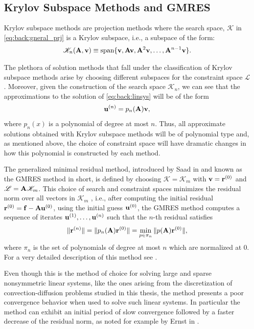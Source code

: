 \subsection{Krylov Subspace Methods and GMRES}
\label{back:itersolvers:krylov}

Krylov subspace methods are projection methods where the search space,
$\mathscr{K}$ in \eqref{eq:back:gneral_prj} is a Krylov subspace, i.e., a
subspace of the form:
\begin{equation}\label{eq:back:krylov}
\mathscr{K}_{n}(\mathbf{A},\mathbf{v})\equiv\text{span}\{\mathbf{v},\mathbf{A}\mathbf{v},\mathbf{A}^2\mathbf{v},\ldots,\mathbf{A}^{n-1}\mathbf{v}\}.
\end{equation}

The plethora of solution methods that fall under the classification of Krylov subspace methods  arise by choosing different subspaces for the constraint space $\mathscr{L}$. Moreover, given the construction of the search space $\mathscr{K}_{n}$, we can see that the approximations to the solution of \eqref{eq:back:linsys} will be of the form
\begin{equation}
\mathbf{u}^{(n)}=p_{n}(\mathbf{A})\mathbf{v},
\end{equation}
where $p_{n}(x)$ is a polynomial of degree at most $n$. Thus, all approximate
solutions obtained with Krylov subspace methods will be of polynomial type and,
as mentioned above, the choice of constraint space will have dramatic changes
in how this polynomial is constructed by each method.

The generalized minimal residual method, introduced by Saad in \cite{Saa86} and known as the GMRES method in short, is defined by choosing $\mathscr{K}=\mathscr{K}_m$ with $\mathbf{v}=\mathbf{r}^{(0)}$ and $\mathscr{L}=\mathbf{A}\mathscr{K}_m$. This choice of search and constraint spaces minimizes the residual norm over all vectors in $\mathscr{K}_m$ \cite{Saa03}, i.e., after computing the initial residual $\mathbf{r}^{(0)}=\mathbf{f}-\mathbf{A}\mathbf{u}^{(0)}$, using the initial guess $\mathbf{u}^{(0)}$, the GMRES method computes a sequence of iterates $\mathbf{u}^{(1)},\ldots,\mathbf{u}^{(n)}$
such that the $n$-th residual satisfies
\begin{equation}
\|\mathbf{r}^{(n)}\|=\|p_{n}(\mathbf{A})\mathbf{r}^{(0)}\|=\min_{p \in \pi_n}\|p(\mathbf{A})\mathbf{r}^{(0)}\|,
\end{equation}
where $\pi_n$ is the set of polynomials of degree at most $n$ which are
normalized at $0$. For a very detailed description of this method see \cite{LieStr12}.

Even though this is the method of choice for solving large and sparse nonsymmetric linear systems, like the ones arising from the discretization of convection-diffusion problems studied in this thesis, the method presents a poor convergence behavior when used to solve such linear systems. In particular the method can exhibit an initial period of slow convergence followed by a faster decrease of the residual norm, as noted for example by Ernst in \cite{Ern00}.

